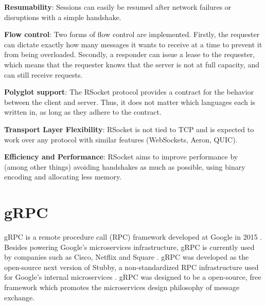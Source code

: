 \textbf{Resumability}: Sessions can easily be resumed after network failures or disruptions with a simple handshake.

\textbf{Flow control}: Two forms of flow control are implemented. Firstly, the requester can dictate exactly how many messages it wants to receive at a time to prevent it from being overloaded. Secondly, a responder can issue a lease to the requester, which means that the requester knows that the server is not at full capacity, and can still receive requests.

\textbf{Polyglot support}: The RSocket protocol provides a contract for the behavior between the client and server. Thus, it does not matter which languages each is written in, as long as they adhere to the contract.

\textbf{Transport Layer Flexibility}: RSocket is not tied to TCP and is expected to work over any protocol with similar features (WebSockets, Aeron, QUIC).

\textbf{Efficiency and Performance}: RSocket aims to improve performance by (among other things) avoiding handshakes as much as possible, using binary encoding and allocating less memory.

\section{gRPC}
gRPC is a remote procedure call (RPC) framework developed at Google in 2015 \cite{marculescu2015introducing}. Besides powering Google's microservices infrastructure, gRPC is currently used by companies such as Cisco, Netflix and Square \cite{aboutgrpc}. gRPC was developed as the open-source next version of Stubby, a non-standardized RPC infrastructure used for Google's internal microservices \cite{ryan2015motivation}. gRPC was designed to be a open-source, free framework which promotes the microservices design philosophy of message exchange.

